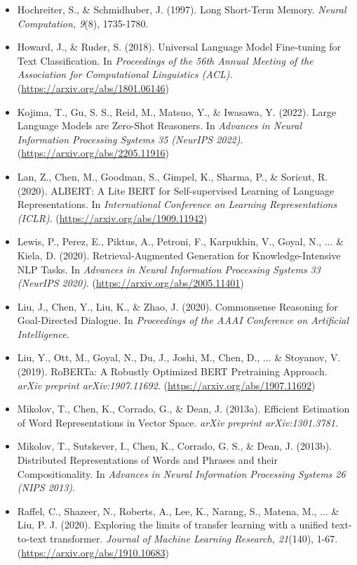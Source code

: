 \documentclass[10.5pt]{article}
\begin{document}
\begin{itemize}
    \item Hochreiter, S., \& Schmidhuber, J. (1997). Long Short-Term Memory. \textit{Neural Computation, 9}(8), 1735-1780.
    \item Howard, J., \& Ruder, S. (2018). Universal Language Model Fine-tuning for Text Classification. In \textit{Proceedings of the 56th Annual Meeting of the Association for Computational Linguistics (ACL)}. (\url{https://arxiv.org/abs/1801.06146})
    \item Kojima, T., Gu, S. S., Reid, M., Matsuo, Y., \& Iwasawa, Y. (2022). Large Language Models are Zero-Shot Reasoners. In \textit{Advances in Neural Information Processing Systems 35 (NeurIPS 2022)}. (\url{https://arxiv.org/abs/2205.11916})
    \item Lan, Z., Chen, M., Goodman, S., Gimpel, K., Sharma, P., \& Soricut, R. (2020). ALBERT: A Lite BERT for Self-supervised Learning of Language Representations. In \textit{International Conference on Learning Representations (ICLR)}. (\url{https://arxiv.org/abs/1909.11942})
    \item Lewis, P., Perez, E., Piktus, A., Petroni, F., Karpukhin, V., Goyal, N., ... \& Kiela, D. (2020). Retrieval-Augmented Generation for Knowledge-Intensive NLP Tasks. In \textit{Advances in Neural Information Processing Systems 33 (NeurIPS 2020)}. (\url{https://arxiv.org/abs/2005.11401})
    \item Liu, J., Chen, Y., Liu, K., \& Zhao, J. (2020). Commonsense Reasoning for Goal-Directed Dialogue. In \textit{Proceedings of the AAAI Conference on Artificial Intelligence}.
    \item Liu, Y., Ott, M., Goyal, N., Du, J., Joshi, M., Chen, D., ... \& Stoyanov, V. (2019). RoBERTa: A Robustly Optimized BERT Pretraining Approach. \textit{arXiv preprint arXiv:1907.11692}. (\url{https://arxiv.org/abs/1907.11692})
    \item Mikolov, T., Chen, K., Corrado, G., \& Dean, J. (2013a). Efficient Estimation of Word Representations in Vector Space. \textit{arXiv preprint arXiv:1301.3781}.
    \item Mikolov, T., Sutskever, I., Chen, K., Corrado, G. S., \& Dean, J. (2013b). Distributed Representations of Words and Phrases and their Compositionality. In \textit{Advances in Neural Information Processing Systems 26 (NIPS 2013)}.
    \item Raffel, C., Shazeer, N., Roberts, A., Lee, K., Narang, S., Matena, M., ... \& Liu, P. J. (2020). Exploring the limits of transfer learning with a unified text-to-text transformer. \textit{Journal of Machine Learning Research, 21}(140), 1-67. (\url{https://arxiv.org/abs/1910.10683})

\end{itemize}
\end{document}
